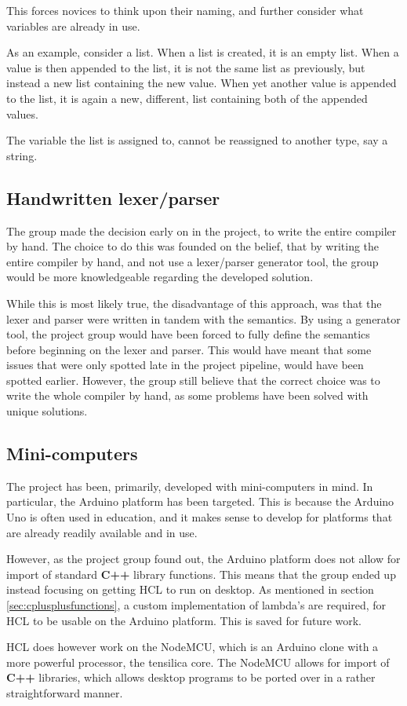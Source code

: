 This forces novices to think upon their naming, and further consider what variables are already in use.

As an example, consider a list.
When a list is created, it is an empty list.
When a value is then appended to the list, it is not the same list as previously, but instead a new list containing the new value.
When yet another value is appended to the list, it is again a new, different, list containing both of the appended values.

The variable the list is assigned to, cannot be reassigned to another type, say a string.

\subsection{Handwritten lexer/parser}
The group made the decision early on in the project, to write the entire compiler by hand.
The choice to do this was founded on the belief, that by writing the entire compiler by hand, and not use a lexer/parser generator tool, the group would be more knowledgeable regarding the developed solution.

While this is most likely true, the disadvantage of this approach, was that the lexer and parser were written in tandem with the semantics.
By using a generator tool, the project group would have been forced to fully define the semantics before beginning on the lexer and parser.
This would have meant that some issues that were only spotted late in the project pipeline, would have been spotted earlier.
However, the group still believe that the correct choice was to write the whole compiler by hand, as some problems have been solved with unique solutions.

\subsection{Mini-computers}
The project has been, primarily, developed with mini-computers in mind.
In particular, the Arduino platform has been targeted.
This is because the Arduino Uno is often used in education, and it makes sense to develop for platforms that are already readily available and in use.

However, as the project group found out, the Arduino platform does not allow for import of standard \textbf{C++} library functions.
This means that the group ended up instead focusing on getting HCL to run on desktop.
As mentioned in section \ref{sec:cplusplusfunctions}, a custom implementation of lambda's are required, for HCL to be usable on the Arduino platform.
This is saved for future work.

HCL does however work on the NodeMCU, which is an Arduino clone with a more powerful processor, the tensilica core.
The NodeMCU allows for import of \textbf{C++} libraries, which allows desktop programs to be ported over in a rather straightforward manner.

